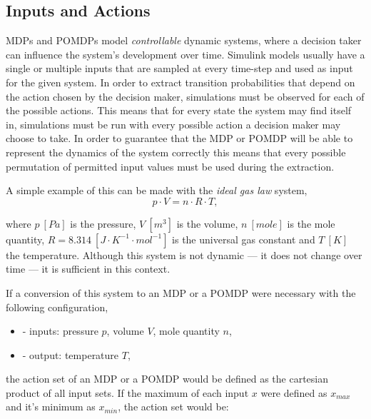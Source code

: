 \subsection{Inputs and Actions}
\label{subsec:inputsactions}

MDPs and POMDPs model \textit{controllable} dynamic systems, where a decision taker can influence the system's development over time. Simulink models usually have a single or multiple inputs that are sampled at every time-step and used as input for the given system. In order to extract transition probabilities that depend on the action chosen by the decision maker, simulations must be observed for each of the possible actions. This means that for every state the system may find itself in, simulations must be run with every possible action a decision maker may choose to take. In order to guarantee that the MDP or POMDP will be able to represent the dynamics of the system correctly this means that every possible permutation of permitted input values must be used during the extraction.

A simple example of this can be made with the \textit{ideal gas law} system,
\[
p\cdot V = n \cdot R \cdot T,
\]

where $p\ [Pa]$ is the pressure, $V\ [m^3]$ is the volume, $n\ [mole]$ is the mole quantity, $ R = 8.314\ [J\cdot K^{-1} \cdot mol^{-1}]$ is the universal gas constant and $T\ [K]$ the temperature. Although this system is not dynamic --- it does not change over time --- it is sufficient in this context.

If a conversion of this system to an MDP or a POMDP were necessary with the following configuration,

\begin{itemize}
\item - inputs: pressure $p$, volume $V$, mole quantity $n$,
\item - output: temperature $T$,
\end{itemize}
the action set of an MDP or a POMDP would be defined as the cartesian product of all input sets. If the maximum of each input $x$ were defined as $x_{max}$ and it's minimum as $x_{min}$, the action set would be:

